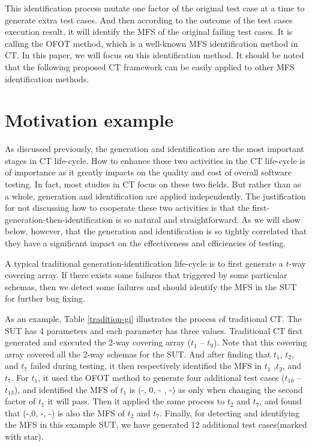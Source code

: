 \documentclass{sig-alternate}
\begin{document}
This identification process mutate one factor of the original test case at a time to generate extra test cases. And then according to the outcome of the test cases execution result, it will identify the MFS of the original failing test cases. It is calling the OFOT method, which is a well-known MFS identification method in CT. In this paper, we will focus on this identification method. It should be noted that the following proposed CT framework can be easily applied to other MFS identification methods.


\section{Motivation example}
As discussed previously, the generation and identification are the most important stages in CT life-cycle. How to enhance these two activities in the CT life-cycle is of importance as it greatly impacts on the quality and cost of overall software testing. In fact, most studies in CT focus on these two fields. But rather than as a whole, generation and identification are applied independently. The justification for not discussing how to cooperate these two activities is that the first-generation-then-identification is so natural and straightforward. As we will show below, however, that the generation and identification is so tightly correlated that they have a significant impact on the effectiveness and efficiencies of testing.

A typical traditional generation-identification life-cycle is to first generate a $t$-way covering array. If there exists some failures that triggered by some particular schemas, then we detect some failures and should identify the MFS in the SUT for further bug fixing.

As an example, Table \ref{tradition-gi} illustrates the process of traditional CT. The SUT has 4 parameters and each parameter has three values. Traditional CT first generated and executed the 2-way covering array ($t_{1}$ -- $t_{9}$). Note that this covering array covered all the 2-way schemas for the SUT. And after finding that $t_{1}$, $t_{2}$, and $t_{7}$ failed during testing, it then respectively identified the MFS in $t_{1}$ ,$t_{2}$, and $t_{7}$. For $t_{1}$, it used the OFOT method to generate four additional test cases ($t_{10}$ -- $t_{13}$), and identified the MFS of $t_{1}$ is (-, 0, - , -) as only when changing the second factor of $t_{1}$ it will pass. Then it applied the same process to $t_{2}$ and $t_{7}$, and found that (-,0, -, -) is also the MFS of $t_{2}$ and $t_{7}$.  Finally, for detecting and identifying the MFS in this example SUT, we have generated 12 additional test cases(marked with star).
\end{document}
